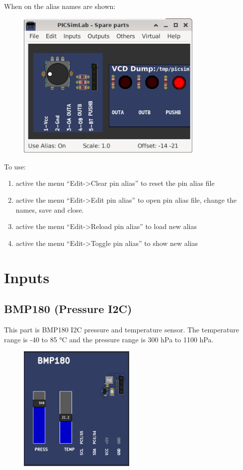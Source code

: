 When on the alias names are shown:
\begin{figure}[H]
\center
\includegraphics[width=0.80\textwidth]{img/pin_alias_on.png} 
\end{figure} 

To use:
\begin{enumerate}
 \item active the menu ``Edit->Clear pin alias'' to reset the pin alias file
 \item active the menu ``Edit->Edit pin alias'' to open pin alias file, change the names, save and close.
 \item active the menu ``Edit->Reload pin alias'' to load new alias
 \item active the menu ``Edit->Toggle pin alias'' to show new alias
\end{enumerate}


\section{Inputs}


\subsection{BMP180 (Pressure I2C)} 

This part is BMP180 I2C pressure and temperature sensor. 
The temperature  range is -40 to 85 °C  
and the pressure range is 300 hPa to 1100 hPa.

\begin{figure}[H]
\center
\includegraphics[width=0.5\textwidth]{img/part_bmp180.png} 
\end{figure} 


